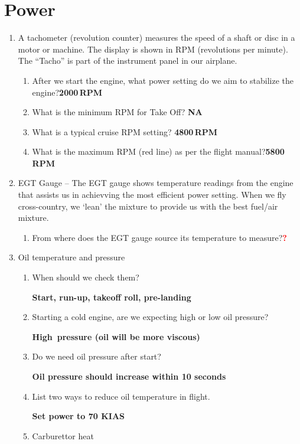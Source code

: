\documentclass[11pt]{article}
\begin{document}
\section{Power}
\begin{enumerate}
	\item A tachometer (revolution counter) measures the speed of a shaft or disc in a motor or machine.
	The display is shown in RPM (revolutions per minute). The ``Tacho'' is part of the instrument panel 
	in our airplane.
	\begin{enumerate}
		\item After we start the engine, what power setting do we aim to stabilize the engine?\hfill\textbf{2000\,RPM}
		\item What is the minimum RPM for Take Off? \hfill\textbf{NA}
		\item What is a typical cruise RPM setting? \hfill\textbf{4800\,RPM}
		\item What is the maximum RPM (red line) as per the flight manual?\hfill\textbf{5800\,RPM}
	\end{enumerate}
	\item EGT Gauge -- The EGT gauge shows temperature readings from the engine that assists us in achievving the most efficient
	power setting. When we fly cross-country, we `lean' the mixture to provide us with the best fuel/air mixture.
	\begin{enumerate}
		\item From where does the EGT gauge source its temperature to measure?\hfill\textbf{\textcolor{red}{?}}
	\end{enumerate}
	\item Oil temperature and pressure
	\begin{enumerate}
		\item When should we check them?

		\textbf{Start, run-up, takeoff roll, pre-landing}
		\item Starting a cold engine, are we expecting high or low oil pressure? 

		\textbf{High~pressure (oil will be more viscous)}
		\item Do we need oil pressure after start? 

		\textbf{Oil pressure should increase within 10 seconds}
		\item List two ways to reduce oil temperature in flight.

		\textbf{Set power to 70 KIAS}
		\item Carburettor heat


\end{enumerate}
\end{enumerate}
\end{document}
